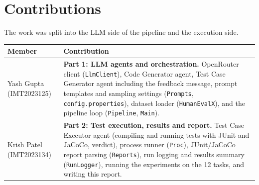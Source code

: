 \documentclass[11pt,a4paper]{article}
\begin{document}
\section{Contributions}
The work was split into the LLM side of the pipeline and the execution side.

\begin{table}[H]
\centering
\small
\begin{tabularx}{\textwidth}{@{}lX@{}}
\toprule
Member & Contribution \\
\midrule
Yash Gupta (IMT2023125) & \textbf{Part 1: LLM agents and orchestration.} OpenRouter client (\texttt{LlmClient}), Code Generator agent, Test Case Generator agent including the feedback message, prompt templates and sampling settings (\texttt{Prompts}, \texttt{config.properties}), dataset loader (\texttt{HumanEvalX}), and the pipeline loop (\texttt{Pipeline}, \texttt{Main}). \\
\addlinespace
Krish Patel (IMT2023134) & \textbf{Part 2: Test execution, results and report.} Test Case Executor agent (compiling and running tests with JUnit and JaCoCo, verdict), process runner (\texttt{Proc}), JUnit/JaCoCo report parsing (\texttt{Reports}), run logging and results summary (\texttt{RunLogger}), running the experiments on the 12 tasks, and writing this report. \\
\bottomrule
\end{tabularx}
\end{table}
\end{document}
